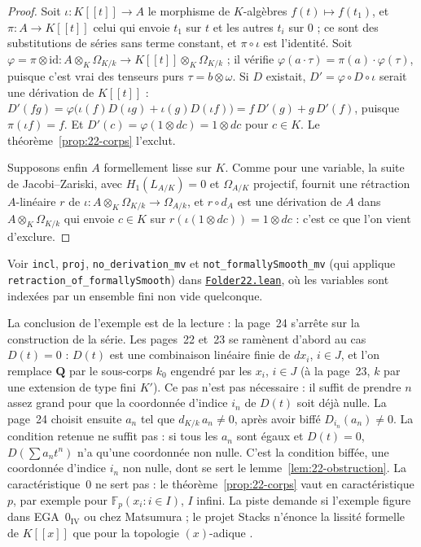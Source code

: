 \begin{proof}
Soit $\iota : K[[t]] \to A$ le morphisme de $K$-algèbres $f(t) \mapsto f(t_1)$, et $\pi : A \to K[[t]]$ celui qui envoie $t_1$ sur $t$ et les autres $t_i$ sur $0$ ; ce sont des substitutions de séries sans terme constant, et $\pi \circ \iota$ est l'identité. Soit $\varphi = \pi \otimes \mathrm{id} : A \otimes_K \Omega_{K/k} \to K[[t]] \otimes_K \Omega_{K/k}$ ; il vérifie $\varphi(a \cdot \tau) = \pi(a) \cdot \varphi(\tau)$, puisque c'est vrai des tenseurs purs $\tau = b \otimes \omega$. Si $D$ existait, $D' = \varphi \circ D \circ \iota$ serait une dérivation de $K[[t]]$ : $D'(fg) = \varphi\bigl(\iota(f) D(\iota g) + \iota(g) D(\iota f)\bigr) = f\,D'(g) + g\,D'(f)$, puisque $\pi(\iota f) = f$. Et $D'(c) = \varphi(1 \otimes dc) = 1 \otimes dc$ pour $c \in K$. Le théorème~\ref{prop:22-corps} l'exclut.

Supposons enfin $A$ formellement lisse sur $K$. Comme pour une variable, la suite de Jacobi--Zariski, avec $H_1(L_{A/K}) = 0$ et $\Omega_{A/K}$ projectif, fournit une rétraction $A$-linéaire $r$ de $\iota : A \otimes_K \Omega_{K/k} \to \Omega_{A/k}$, et $r \circ d_A$ est une dérivation de $A$ dans $A \otimes_K \Omega_{K/k}$ qui envoie $c \in K$ sur $r(\iota(1 \otimes dc)) = 1 \otimes dc$ : c'est ce que l'on vient d'exclure.
\end{proof}

\begingroup\raggedright
\noindent Voir \texttt{incl}, \texttt{proj}, \texttt{no\_derivation\_mv} et \texttt{not\_formallySmooth\_mv} (qui applique \texttt{retraction\_of\_formallySmooth}) dans \href{\leanblob/RingTheory/Folder22.lean}{\texttt{Folder22.\allowbreak{}lean}}, où les variables sont indexées par un ensemble fini non vide quelconque.\par\endgroup

\begin{remarque}
La conclusion de l'exemple est de la lecture : la page~24 s'arrête sur la construction de la série. Les pages~22 et~23 se ramènent d'abord au cas $D(t) = 0$ : $D(t)$ est une combinaison linéaire finie de $dx_i$, $i \in J$, et l'on remplace $\mathbf Q$ par le sous-corps $k_0$ engendré par les $x_i$, $i \in J$ (à la page~23, $k$ par une extension de type fini $K'$). Ce pas n'est pas nécessaire : il suffit de prendre $n$ assez grand pour que la coordonnée d'indice $i_n$ de $D(t)$ soit déjà nulle. La page~24 choisit ensuite $a_n$ tel que $d_{K/k}\,a_n \neq 0$, après avoir biffé $D_{i_n}(a_n) \neq 0$. La condition retenue ne suffit pas : si tous les $a_n$ sont égaux et $D(t) = 0$, $D(\sum a_n t^n)$ n'a qu'une coordonnée non nulle. C'est la condition biffée, une coordonnée d'indice $i_n$ non nulle, dont se sert le lemme~\ref{lem:22-obstruction}. La caractéristique~$0$ ne sert pas : le théorème~\ref{prop:22-corps} vaut en caractéristique $p$, par exemple pour $\mathbb F_p(x_i : i \in I)$, $I$ infini. La piste demande si l'exemple figure dans EGA~$0_{\mathrm{IV}}$ ou chez Matsumura ; le projet Stacks n'énonce la lissité formelle de $K[[x]]$ que pour la topologie $(x)$-adique \cite[tags 07EL et 07EM]{stacks}.
\end{remarque}

